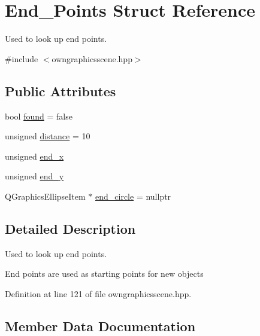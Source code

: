 \hypertarget{structEnd__Points}{}\section{End\+\_\+\+Points Struct Reference}
\label{structEnd__Points}


Used to look up end points.  




{\ttfamily \#include $<$owngraphicsscene.\+hpp$>$}

\subsection*{Public Attributes}
\begin{DoxyCompactItemize}
\item 
bool \mbox{\hyperlink{structEnd__Points_aff9dd173210b07bb087d70cf5ec9439f}{found}} = false
\item 
unsigned \mbox{\hyperlink{structEnd__Points_a08442d5de0da7d680a5a0fba7df6cf3b}{distance}} = 10
\item 
unsigned \mbox{\hyperlink{structEnd__Points_a2b33a99792ec437e7c2369ceaf435176}{end\+\_\+x}}
\item 
unsigned \mbox{\hyperlink{structEnd__Points_a04207ee9a97ee6d785b493305cd9e7e8}{end\+\_\+y}}
\item 
Q\+Graphics\+Ellipse\+Item $\ast$ \mbox{\hyperlink{structEnd__Points_abf301947140c1584823b50071c7b8ee6}{end\+\_\+circle}} = nullptr
\end{DoxyCompactItemize}


\subsection{Detailed Description}
Used to look up end points. 

End points are used as starting points for new objects 

Definition at line 121 of file owngraphicsscene.\+hpp.



\subsection{Member Data Documentation}
\mbox{\label{structEnd__Points_a08442d5de0da7d680a5a0fba7df6cf3b}} 
